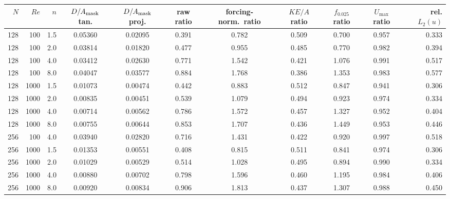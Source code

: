\begin{tabular}{@{}rrrcccccccr@{}}
\toprule
$N$ & $Re$ & $n$ & $D/A_{\rm mask}$ tan. & $D/A_{\rm mask}$ proj. & raw ratio &
forcing-norm.\ ratio & $KE/A$ ratio & $f_{0.025}$ ratio & $U_{\max}$ ratio & rel. $L_2(u)$ \\
\midrule
128 & 100 & 1.5 & 0.05360 & 0.02095 & 0.391 & 0.782 & 0.509 & 0.700 & 0.957 & 0.333 \\
128 & 100 & 2.0 & 0.03814 & 0.01820 & 0.477 & 0.955 & 0.485 & 0.770 & 0.982 & 0.394 \\
128 & 100 & 4.0 & 0.03412 & 0.02630 & 0.771 & 1.542 & 0.421 & 1.076 & 0.991 & 0.517 \\
128 & 100 & 8.0 & 0.04047 & 0.03577 & 0.884 & 1.768 & 0.386 & 1.353 & 0.983 & 0.577 \\
128 & 1000 & 1.5 & 0.01073 & 0.00474 & 0.442 & 0.883 & 0.512 & 0.847 & 0.941 & 0.306 \\
128 & 1000 & 2.0 & 0.00835 & 0.00451 & 0.539 & 1.079 & 0.494 & 0.923 & 0.974 & 0.334 \\
128 & 1000 & 4.0 & 0.00714 & 0.00562 & 0.786 & 1.572 & 0.457 & 1.327 & 0.952 & 0.404 \\
128 & 1000 & 8.0 & 0.00755 & 0.00644 & 0.853 & 1.707 & 0.436 & 1.449 & 0.953 & 0.446 \\
256 & 100 & 4.0 & 0.03940 & 0.02820 & 0.716 & 1.431 & 0.422 & 0.920 & 0.997 & 0.518 \\
256 & 1000 & 1.5 & 0.01353 & 0.00551 & 0.408 & 0.815 & 0.511 & 0.841 & 0.974 & 0.306 \\
256 & 1000 & 2.0 & 0.01029 & 0.00529 & 0.514 & 1.028 & 0.495 & 0.894 & 0.990 & 0.334 \\
256 & 1000 & 4.0 & 0.00880 & 0.00702 & 0.798 & 1.596 & 0.460 & 1.195 & 0.984 & 0.406 \\
256 & 1000 & 8.0 & 0.00920 & 0.00834 & 0.906 & 1.813 & 0.437 & 1.307 & 0.988 & 0.450 \\
\bottomrule
\end{tabular}
